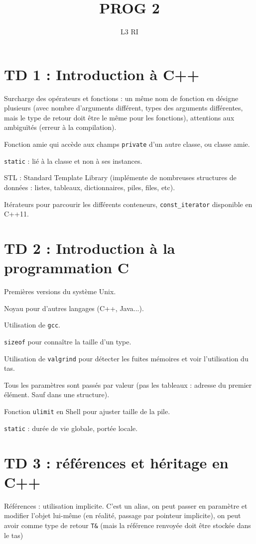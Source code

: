 \documentclass[french]{article}
\title{PROG 2}
\date{}
\author{L3 RI}
\def\code#1{\texttt{#1}}
\begin{document}
\maketitle
\section*{TD 1 : Introduction à C++}
Surcharge des opérateurs et fonctions : un même nom de fonction en désigne plusieurs (avec nombre d'arguments différent, types des arguments différentes, mais le type de retour doit être le même pour les fonctions),
attentions aux ambiguïtés (erreur à la compilation).

Fonction amie qui accède aux champs \code{private} d'un autre classe, ou classe amie.

\code{static} : lié à la classe et non à ses instances.

STL : Standard Template Library (implémente de nombreuses structures de données : listes, tableaux, dictionnaires, piles, files, etc).

Itérateurs pour parcourir les différents conteneurs, \code{const\_iterator} disponible en C++11.

\section*{TD 2 : Introduction à la programmation C}
Premières versions du système Unix.

Noyau pour d'autres langages (C++, Java...).

Utilisation de \code{gcc}.

\code{sizeof} pour connaître la taille d'un type.

Utilisation de \code{valgrind} pour détecter les fuites mémoires et voir l'utilisation du tas.

Tous les paramètres sont passés par valeur (pas les tableaux : adresse du premier élément. Sauf dans une structure).

Fonction \code{ulimit} en Shell pour ajuster taille de la pile.

\code{static} : durée de vie globale, portée locale.

\section*{TD 3 : références et héritage en C++}

Références : utilisation implicite. C'est un alias, on peut passer en paramètre et modifier l'objet lui-même (en réalité, passage par pointeur implicite), on peut avoir comme type de retour \code{T\&} (mais la référence renvoyée doit être stockée dans le tas)
\end{document}

